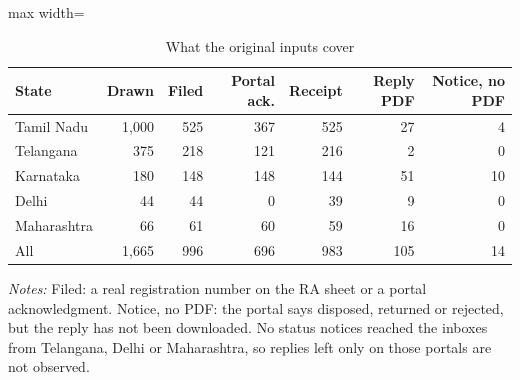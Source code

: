 \begin{table}[!htbp]
\centering
\caption{What the original inputs cover}
\label{tab:tab_audit}
\small
\begin{adjustbox}{max width=\textwidth}
\begin{threeparttable}
\begin{tabular}{lrrrrrr}
\toprule
State & Drawn & Filed & Portal ack. & Receipt & Reply PDF & Notice, no PDF \\
\midrule
Tamil Nadu & 1,000 & 525 & 367 & 525 & 27 & 4 \\
Telangana & 375 & 218 & 121 & 216 & 2 & 0 \\
Karnataka & 180 & 148 & 148 & 144 & 51 & 10 \\
Delhi & 44 & 44 & 0 & 39 & 9 & 0 \\
Maharashtra & 66 & 61 & 60 & 59 & 16 & 0 \\
\midrule
All & 1,665 & 996 & 696 & 983 & 105 & 14 \\
\bottomrule
\end{tabular}
\begin{tablenotes}[flushleft]\footnotesize
\item \textit{Notes:} Filed: a real registration number on the RA sheet or a portal acknowledgment. Notice, no PDF: the portal says disposed, returned or rejected, but the reply has not been downloaded. No status notices reached the inboxes from Telangana, Delhi or Maharashtra, so replies left only on those portals are not observed.
\end{tablenotes}
\end{threeparttable}
\end{adjustbox}
\end{table}
